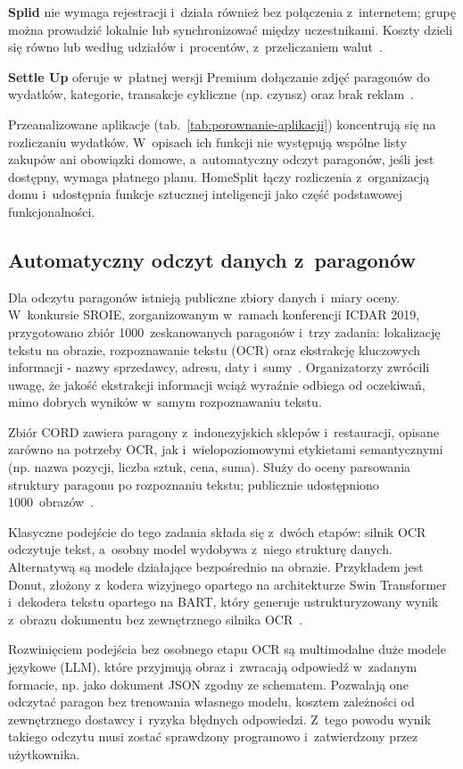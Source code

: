 \textbf{Splid} nie wymaga rejestracji i~działa również bez połączenia z~internetem; grupę można prowadzić lokalnie lub synchronizować między uczestnikami. Koszty dzieli się równo lub według udziałów i~procentów, z~przeliczaniem walut~\cite{splid-appstore}.

\textbf{Settle Up} oferuje w~płatnej wersji Premium dołączanie zdjęć paragonów do wydatków, kategorie, transakcje cykliczne (np. czynsz) oraz brak reklam~\cite{settleup-appstore}.

Przeanalizowane aplikacje (tab.~\ref{tab:porownanie-aplikacji}) koncentrują się na rozliczaniu wydatków. W~opisach ich funkcji nie występują wspólne listy zakupów ani obowiązki domowe, a~automatyczny odczyt paragonów, jeśli jest dostępny, wymaga płatnego planu. HomeSplit łączy rozliczenia z~organizacją domu i~udostępnia funkcje sztucznej inteligencji jako część podstawowej funkcjonalności.

\subsection{Automatyczny odczyt danych z~paragonów}

Dla odczytu paragonów istnieją publiczne zbiory danych i~miary oceny. W~konkursie SROIE, zorganizowanym w~ramach konferencji ICDAR 2019, przygotowano zbiór 1000~zeskanowanych paragonów i~trzy zadania: lokalizację tekstu na obrazie, rozpoznawanie tekstu (OCR) oraz ekstrakcję kluczowych informacji - nazwy sprzedawcy, adresu, daty i~sumy~\cite{huang2019sroie}. Organizatorzy zwrócili uwagę, że jakość ekstrakcji informacji wciąż wyraźnie odbiega od oczekiwań, mimo dobrych wyników w~samym rozpoznawaniu tekstu.

Zbiór CORD zawiera paragony z~indonezyjskich sklepów i~restauracji, opisane zarówno na potrzeby OCR, jak i~wielopoziomowymi etykietami semantycznymi (np. nazwa pozycji, liczba sztuk, cena, suma). Służy do oceny parsowania struktury paragonu po rozpoznaniu tekstu; publicznie udostępniono 1000~obrazów~\cite{park2019cord}.

Klasyczne podejście do tego zadania składa się z~dwóch etapów: silnik OCR odczytuje tekst, a~osobny model wydobywa z~niego strukturę danych. Alternatywą są modele działające bezpośrednio na obrazie. Przykładem jest Donut, złożony z~kodera wizyjnego opartego na architekturze Swin Transformer i~dekodera tekstu opartego na BART, który generuje ustrukturyzowany wynik z~obrazu dokumentu bez zewnętrznego silnika OCR~\cite{kim2022donut}.

Rozwinięciem podejścia bez osobnego etapu OCR są multimodalne duże modele językowe (LLM), które przyjmują obraz i~zwracają odpowiedź w~zadanym formacie, np. jako dokument JSON zgodny ze schematem. Pozwalają one odczytać paragon bez trenowania własnego modelu, kosztem zależności od zewnętrznego dostawcy i~ryzyka błędnych odpowiedzi. Z~tego powodu wynik takiego odczytu musi zostać sprawdzony programowo i~zatwierdzony przez użytkownika.

